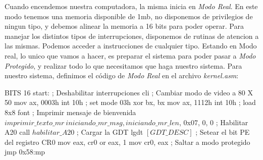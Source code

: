 Cuando encendemos nuestra computadora, la misma inicia en \textit{Modo Real}. En este modo tenemos una memoria disponible de 1mb, no disponemos de privilegios de ningun tipo, y debemos alinear la memoria a 16 bits para poder operar.
Para manejar los distintos tipos de interrupciones, disponemos de rutinas de atencion a las mismas. Podemos acceder a instrucciones de cualquier tipo.
Estando en Modo real, lo unico que vamos a hacer, es preparar el sistema para poder pasar a \textit{Modo Protegido}, y realizar todo lo que necesitamos que haga nuestro sistema.
Para nuestro sistema, definimos el c\'odigo de \textit{Modo Real} en el archivo \textit{kernel.asm}:

\begin{algorithmic}
\State \tab BITS 16
\State \tab start:
    \State \tab \tab ; Deshabilitar interrupciones
    \State \tab \tab cli
\newline
\State \tab \tab     ; Cambiar modo de video a 80 X 50
    \State \tab \tab mov ax, 0003h
    \State \tab \tab int 10h ; set mode 03h
    \State \tab \tab xor bx, bx
    \State \tab \tab mov ax, 1112h
    \State \tab \tab int 10h ; load 8x8 font
\newline
    \State \tab \tab ; Imprimir mensaje de bienvenida
    \State \tab \tab $imprimir\_texto\_mr \ iniciando\_mr\_msg, iniciando\_mr\_len$, 0x07, 0, 0
    \State \tab \tab ; Habilitar A20
    \State \tab \tab call $habilitar\_A20$
    \State \tab \tab ; Cargar la GDT
    \State \tab \tab lgdt $[GDT\_DESC]$
    \newline
    \State \tab \tab ; Setear el bit PE del registro CR0
    \State \tab \tab mov eax, cr0
    \State \tab \tab or eax, 1
    \State \tab \tab mov cr0, eax
    \newline
    \State \tab \tab ; Saltar a modo protegido
    \State \tab \tab jmp 0x58:mp
    
    \end{algorithmic}
    
